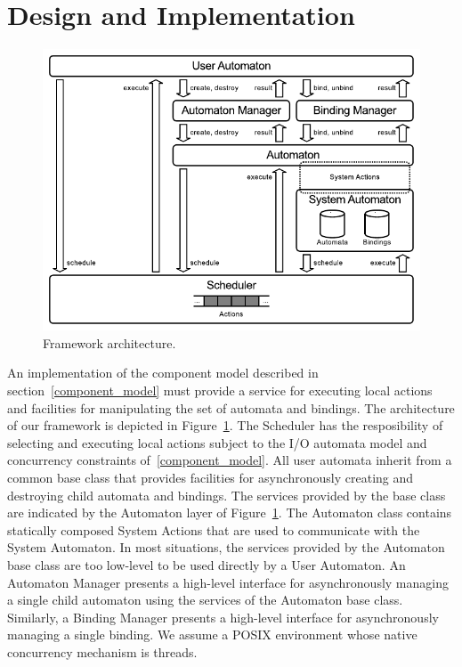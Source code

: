 \section{Design and Implementation\label{design}}

\begin{figure}
\center
\includegraphics[width=\textwidth]{architecture}
\caption{Framework architecture.}
\label{framework_architecture}
\end{figure}

An implementation of the component model described in section~\ref{component_model} must provide a service for executing local actions and facilities for manipulating the set of automata and bindings.
The architecture of our framework is depicted in Figure~\ref{framework_architecture}.
The Scheduler has the resposibility of selecting and executing local actions subject to the I/O automata model and concurrency constraints of~\ref{component_model}.
All user automata inherit from a common base class that provides facilities for asynchronously creating and destroying child automata and bindings.
The services provided by the base class are indicated by the Automaton layer of Figure~\ref{framework_architecture}.
The Automaton class contains statically composed System Actions that are used to communicate with the System Automaton.
In most situations, the services provided by the Automaton base class are too low-level to be used directly by a User Automaton.
An Automaton Manager presents a high-level interface for asynchronously managing a single child automaton using the services of the Automaton base class.
Similarly, a Binding Manager presents a high-level interface for asynchronously managing a single binding.
We assume a POSIX environment whose native concurrency mechanism is threads.

